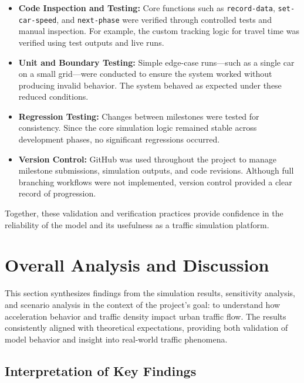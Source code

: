 \documentclass[12pt]{article}
\begin{document}
\begin{itemize}
    \item \textbf{Code Inspection and Testing:}  
    Core functions such as \texttt{record-data}, \texttt{set-car-speed}, and \texttt{next-phase} were verified through controlled tests and manual inspection. For example, the custom tracking logic for travel time was verified using test outputs and live runs.
    
    \item \textbf{Unit and Boundary Testing:}  
    Simple edge-case runs—such as a single car on a small grid—were conducted to ensure the system worked without producing invalid behavior. The system behaved as expected under these reduced conditions.
    
    \item \textbf{Regression Testing:}  
    Changes between milestones were tested for consistency. Since the core simulation logic remained stable across development phases, no significant regressions occurred.
    
    \item \textbf{Version Control:}  
    GitHub was used throughout the project to manage milestone submissions, simulation outputs, and code revisions. Although full branching workflows were not implemented, version control provided a clear record of progression.
\end{itemize}

Together, these validation and verification practices provide confidence in the reliability of the model and its usefulness as a traffic simulation platform.

\newpage
\section{Overall Analysis and Discussion}

This section synthesizes findings from the simulation results, sensitivity analysis, and scenario analysis in the context of the project’s goal: to understand how acceleration behavior and traffic density impact urban traffic flow. The results consistently aligned with theoretical expectations, providing both validation of model behavior and insight into real-world traffic phenomena.

\subsection{Interpretation of Key Findings}
\end{document}
